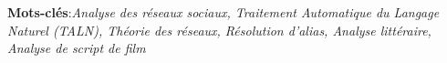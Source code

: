 \documentclass[a4paper, 12pt]{report}
\begin{document}
\textbf{Mots-clés}:\textit{Analyse des réseaux sociaux, Traitement Automatique du Langage Naturel (TALN), Théorie des réseaux, Résolution d'alias, Analyse littéraire, Analyse de script de film}



%
\end{document}
